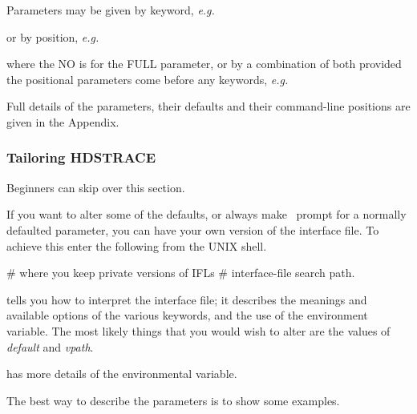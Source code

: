 \documentclass[11pt,nolof]{starlink}
\begin{document}
Parameters may be given by keyword, \emph{e.g.}\
\small
\begin{terminalv}
\end{terminalv}
\normalsize
or by position, \emph{e.g.}\

\small
\begin{terminalv}
\end{terminalv}
\normalsize
where the NO is for the FULL parameter, or by a combination of both
provided the positional parameters come before any keywords, \emph{e.g.}\

\small
\begin{terminalv}
\end{terminalv}
\normalsize
Full details of the parameters, their defaults and their command-line
positions are given in the Appendix.

\subsubsection{Tailoring HDSTRACE}

Beginners can skip over this section.

If you want to alter some of the defaults, or always make
\HDSTRACE\ prompt for a normally defaulted parameter,
you can have your own version of the interface file.
To achieve this enter the following from the UNIX shell.

\small
\begin{terminalv}
                                # where you keep private versions of IFLs
                                # interface-file search path.
\end{terminalv}
\normalsize
{} tells you how to interpret the interface
file; it describes the meanings and available options of the various
keywords, and the use of the \envvar{ADAM\_IFL} environment variable.
The most likely things that you would wish to alter are the values of
\emph{default\/} and \emph{vpath}.

 has more details of the 
environmental variable.
\bigskip

The best way to describe the parameters is to show some examples.
\end{document}
